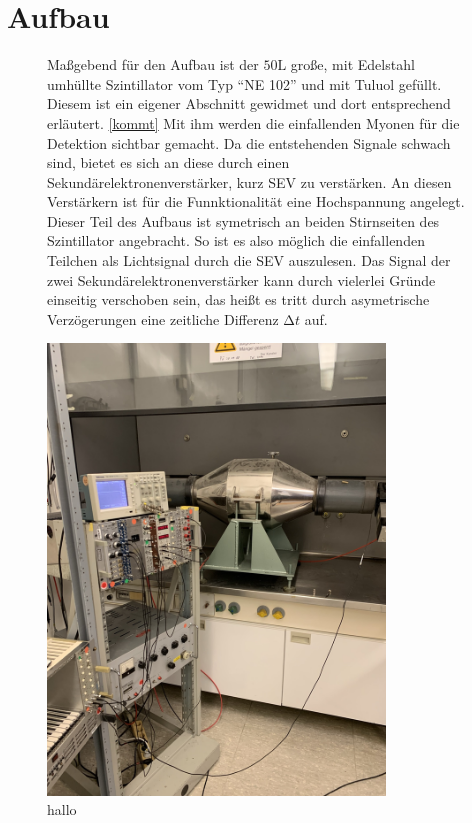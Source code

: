 \newpage
\section{Aufbau}
\begin{figure}
\begin{minipage}{0.49\textwidth}
Maßgebend für den Aufbau ist der $50 \si{\liter}$ große, mit Edelstahl umhüllte Szintillator vom Typ \enquote{NE 102} und mit Tuluol gefüllt. Diesem ist ein eigener Abschnitt gewidmet und dort entsprechend erläutert. \ref{kommt}
Mit ihm werden die einfallenden Myonen für die Detektion sichtbar gemacht. Da die entstehenden Signale schwach sind, bietet es sich an diese durch einen Sekundärelektronenverstärker, kurz SEV zu verstärken. An diesen Verstärkern ist für
die Funnktionalität eine Hochspannung angelegt. Dieser Teil des Aufbaus ist symetrisch an beiden Stirnseiten des Szintillator angebracht. So ist es also möglich die einfallenden Teilchen als Lichtsignal durch die SEV auszulesen.
Das Signal der zwei Sekundärelektronenverstärker kann durch vielerlei Gründe einseitig verschoben sein, das heißt es tritt durch asymetrische Verzögerungen eine zeitliche Differenz $\increment t$ auf.
\end{minipage}%
\begin{minipage}[h]{0.49\textwidth}
    \centering
    \includegraphics[width=0.8\textwidth]{bilder/bild2.png}
    \caption{hallo}
\end{minipage}
\end{figure}
